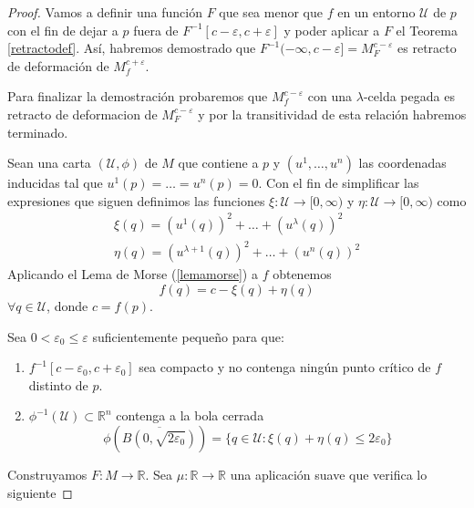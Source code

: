 \begin{proof}
    Vamos a definir una función $F$ que sea menor que $f$ en un entorno $\mathcal{U}$ de $p$ con el fin de dejar a $p$ fuera de $F^{-1}[c-\varepsilon, c+\varepsilon]$ y poder aplicar a $F$ el Teorema \ref{retractodef}. Así, habremos demostrado que $F^{-1}(-\infty,c-\varepsilon]=M^{c-\varepsilon}_F$ es retracto de deformación de $M^{c+\varepsilon}_f$.
    
    Para finalizar la demostración probaremos que $M^{c-\varepsilon}_f$ con una $\lambda$-celda pegada es retracto de deformacion de $M^{c-\varepsilon}_F$ y por la transitividad de esta relación habremos terminado.

    \bigskip

    Sean una carta $(\mathcal{U}, \phi)$ de $M$ que contiene a $p$ y $(u^1,\dots , u^n)$ las coordenadas inducidas tal que $u^1(p)=\dots=u^{n}(p)=0$. Con el fin de simplificar las expresiones que siguen definimos las funciones $\xi:\mathcal{U}\to [0,\infty)$ y $\eta:\mathcal{U}\to [0,\infty)$ como
    \begin{gather*}
        \xi(q)=(u^1(q))^2+\dots +(u^{\lambda}(q))^2\\
        \eta(q)=(u^{\lambda +1}(q))^2+\dots +(u^{n}(q))^2
    \end{gather*}
    Aplicando el Lema de Morse (\ref{lemamorse}) a $f$ obtenemos
    \begin{equation*}
        f(q) = c - \xi(q) + \eta(q)
    \end{equation*}
    $\forall q\in \mathcal{U}$, donde $c=f(p).$

    Sea $0<\varepsilon_0\le\varepsilon$ suficientemente pequeño para que:
    \begin{enumerate}[label=\roman*)]
        \item $f^{-1}[c-\varepsilon_0,c+\varepsilon_0]$ sea compacto y no contenga ningún punto crítico de $f$ distinto de $p$.
        \item $\phi^{-1}(\mathcal{U})\subset \mathbb{R}^n$ contenga a la bola cerrada
        \begin{equation*}
            \phi\left(\overline{B(0, \sqrt{2\varepsilon_0})}\right)= \{q\in \mathcal{U}: \xi(q)+\eta(q)\le 2\varepsilon_0\}
        \end{equation*}
    \end{enumerate}

    Construyamos $F:M\to \mathbb{R}$. Sea $\mu:\mathbb{R}\to\mathbb{R}$ una aplicación suave que verifica lo siguiente
    

\end{proof}

